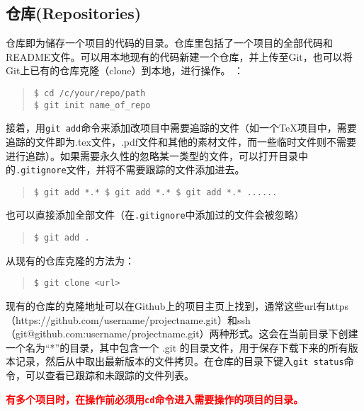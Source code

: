 \documentclass{article}
\begin{document}
		\subsection{仓库(Repositories)}
			仓库即为储存一个项目的代码的目录。仓库里包括了一个项目的全部代码和README文件。可以用本地现有的代码新建一个仓库，并上传至Git，也可以将Git上已有的仓库克隆（clone）到本地，进行操作。
			：
				\begin{quote}
					\begin{lstlisting}
$ cd /c/your/repo/path
$ git init name_of_repo
					\end{lstlisting}
				\end{quote}
			\par 接着，用{\tt git add}命令来添加改项目中需要追踪的文件（如一个TeX项目中，需要追踪的文件即为.tex文件，.pdf文件和其他的素材文件，而一些临时文件则不需要进行追踪）。如果需要永久性的忽略某一类型的文件，可以打开目录中的{\tt .gitignore}文件，并将不需要跟踪的文件添加进去。
			\begin{quote}
				\begin{lstlisting}
$ git add *.* $ git add *.* $ git add *.* ......
				\end{lstlisting}
			\end{quote}
			也可以直接添加全部文件（在{\tt .gitignore}中添加过的文件会被忽略）
			\begin{quote}
				\begin{lstlisting}
$ git add .
				\end{lstlisting}
			\end{quote}
			\par 从现有的仓库克隆的方法为：
			\begin{quote}
				\begin{lstlisting}
$ git clone <url>
				\end{lstlisting}
			\end{quote}
			\par 现有的仓库的克隆地址可以在Github上的项目主页上找到，通常这些url有https（https://github.com/username/projectname.git）和ssh（git@github.com:username/projectname.git）两种形式。这会在当前目录下创建一个名为“*”的目录，其中包含一个 .git 的目录文件，用于保存下载下来的所有版本记录，然后从中取出最新版本的文件拷贝。在仓库的目录下键入{\tt git status}命令，可以查看已跟踪和未跟踪的文件列表。
			\par{\bf\textcolor{red}{有多个项目时，在操作前必须用{\tt cd}命令进入需要操作的项目的目录。}}
\end{document}
